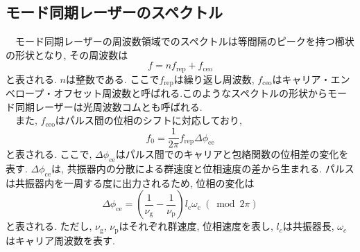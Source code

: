 \documentclass[uplatex, dvipdfmx, a4paper, report, papersize, 11pt]{jsbook}
\begin{document}
\subsection{モード同期レーザーのスペクトル}
　モード同期レーザーの周波数領域でのスペクトルは等間隔のピークを持つ櫛状の形状となり, その周波数は
\begin{equation}
  f = nf_{\mathrm{rep}} + f_{\mathrm{ceo}}
\end{equation}
と表される\cite{Femtosecondopticalfrequencycombs}. $n$は整数である. ここで$f_{\mathrm{rep}}$は繰り返し周波数, $f_{\mathrm{ceo}}$はキャリア・エンベロープ・オフセット周波数と呼ばれる.このようなスペクトルの形状からモード同期レーザーは光周波数コムとも呼ばれる.\\
　また, $f_{\mathrm{ceo}}$はパルス間の位相のシフトに対応しており,
 \begin{equation}
   f _ { 0 } = \frac { 1 } { 2 \pi } f _ { \mathrm { rep } } \Delta \phi _ { \mathrm { ce } }
 \end{equation}
と表される\cite{Femtosecondopticalfrequencycombs}. ここで, $\Delta \phi _ { \mathrm { ce } }$はパルス間でのキャリアと包絡関数の位相差の変化を表す. $\Delta \phi _ { \mathrm { ce } }$は, 共振器内の分散による群速度と位相速度の差から生まれる. パルスは共振器内を一周する度に出力されるため, 位相の変化は
\begin{equation}
  \Delta \phi _ { \mathrm { ce } } = \left( \frac { 1 } { \nu _ \mathrm{ g } } - \frac { 1 } { \nu _ \mathrm{ p } } \right) l _ \mathrm{ c } \omega _ \mathrm{ c }\ (\bmod 2 \pi)
\end{equation}
と表される\cite{Femtosecondopticalfrequencycombs}. ただし, $\nu _ \mathrm{ g }$, $\nu _ \mathrm{ p }$はそれぞれ群速度, 位相速度を表し, $l_c$は共振器長, $\omega_c$はキャリア周波数を表す.
\end{document}
